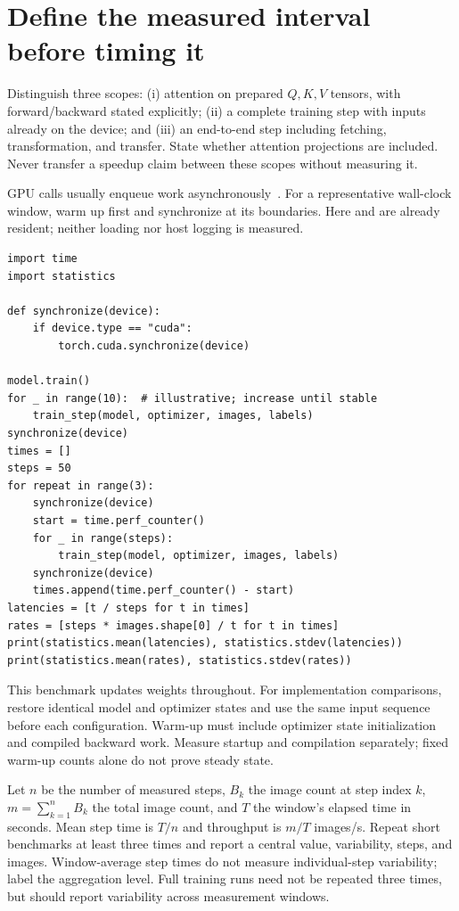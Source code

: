 \documentclass[11pt,a4paper,oneside]{report}
\newcommand{\code}[1]{\texttt{\detokenize{#1}}}
\begin{document}
\newpage
\section{Define the measured interval before timing it}
Distinguish three scopes: (i) attention on prepared $Q,K,V$ tensors, with
forward/backward stated explicitly; (ii) a complete training step with inputs
already on the device; and (iii) an end-to-end step including fetching,
transformation, and transfer. State whether attention projections are included.
Never transfer a speedup claim between these scopes without measuring it.

GPU calls usually enqueue work asynchronously~\cite{cudasemantics}. For a
representative wall-clock window, warm up first and synchronize at its
boundaries. Here \code{images} and \code{labels} are already resident; neither
loading nor host logging is measured.
\begin{lstlisting}[style=python]
import time
import statistics

def synchronize(device):
    if device.type == "cuda":
        torch.cuda.synchronize(device)

model.train()
for _ in range(10):  # illustrative; increase until stable
    train_step(model, optimizer, images, labels)
synchronize(device)
times = []
steps = 50
for repeat in range(3):
    synchronize(device)
    start = time.perf_counter()
    for _ in range(steps):
        train_step(model, optimizer, images, labels)
    synchronize(device)
    times.append(time.perf_counter() - start)
latencies = [t / steps for t in times]
rates = [steps * images.shape[0] / t for t in times]
print(statistics.mean(latencies), statistics.stdev(latencies))
print(statistics.mean(rates), statistics.stdev(rates))
\end{lstlisting}

This benchmark updates weights throughout. For implementation comparisons,
restore identical model and optimizer states and use the same input sequence
before each configuration. Warm-up must include optimizer state initialization
and compiled backward work. Measure startup and compilation separately; fixed
warm-up counts alone do not prove steady state.

Let $n$ be the number of measured steps, $B_k$ the image count at step index
$k$, $m=\sum_{k=1}^{n}B_k$ the total image count, and $T$ the window's elapsed
time in seconds. Mean step time is $T/n$ and throughput is $m/T$ images/s. Repeat short
benchmarks at least three times and report a central value, variability,
steps, and images. Window-average step times do not measure individual-step
variability; label the aggregation level. Full training runs need not be
repeated three times, but should report variability across measurement windows.
\end{document}
